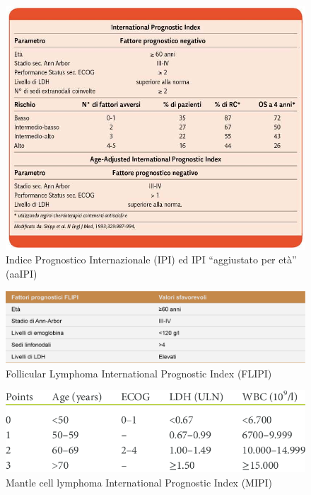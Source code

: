 \begin{figure}[H]
    \begin{center}
    \includegraphics[width=0.7\columnwidth]{img/IPI-AAIPI.jpeg}
    \vspace{-3mm}
    \end{center}
    \caption{Indice Prognostico Internazionale (IPI) ed IPI “aggiustato per età” (aaIPI)
    \cite{img15-18}}
    \label{fig:FIGURE_2.16}
\end{figure}

\begin{figure}[H]
    \begin{center}
    \includegraphics[width=0.8\columnwidth]{img/FLIPI.png}
    \vspace{-3mm}
    \end{center}
    \caption{Follicular Lymphoma International Prognostic Index (FLIPI)
    \cite{img19}}
    \label{fig:FIGURE_2.17}
\end{figure}

\begin{figure}[H]
    \begin{center}
    \includegraphics[width=0.6\columnwidth]{img/MIPI.png}
    \vspace{-3mm}
    \end{center}
    \caption{Mantle cell lymphoma International Prognostic Index (MIPI)
    \cite{MIPI}}
\label{fig:FIGURE_2.18}
\end{figure}

